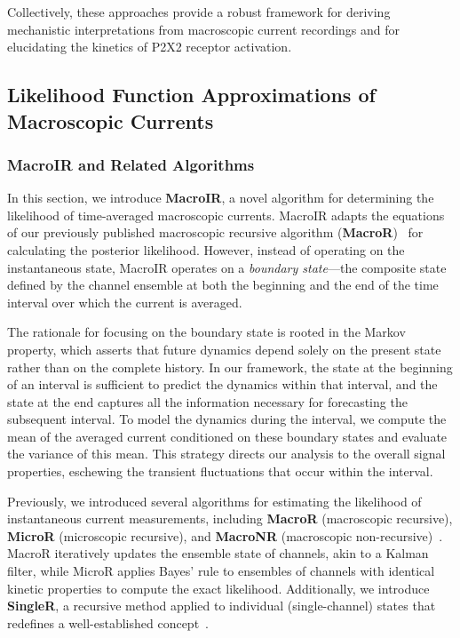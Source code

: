 \documentclass[9pt]{elife}
\begin{document}
	Collectively, these approaches provide a robust framework for deriving mechanistic interpretations from macroscopic current recordings and for elucidating the kinetics of P2X2 receptor activation.
	

\subsection{Likelihood Function Approximations of Macroscopic Currents}

\subsubsection{MacroIR and Related Algorithms}
In this section, we introduce \textbf{MacroIR}, a novel algorithm for determining the likelihood of time-averaged macroscopic currents. MacroIR adapts the equations of our previously published macroscopic recursive algorithm (\textbf{MacroR})~\cite{Moffatt} for calculating the posterior likelihood. However, instead of operating on the instantaneous state, MacroIR operates on a \emph{boundary state}—the composite state defined by the channel ensemble at both the beginning and the end of the time interval over which the current is averaged.

The rationale for focusing on the boundary state is rooted in the Markov property, which asserts that future dynamics depend solely on the present state rather than on the complete history. In our framework, the state at the beginning of an interval is sufficient to predict the dynamics within that interval, and the state at the end captures all the information necessary for forecasting the subsequent interval. To model the dynamics during the interval, we compute the mean of the averaged current conditioned on these boundary states and evaluate the variance of this mean. This strategy directs our analysis to the overall signal properties, eschewing the transient fluctuations that occur within the interval.

Previously, we introduced several algorithms for estimating the likelihood of instantaneous current measurements, including \textbf{MacroR} (macroscopic recursive), \textbf{MicroR} (microscopic recursive), and \textbf{MacroNR} (macroscopic non-recursive)~\cite{Moffatt}. MacroR iteratively updates the ensemble state of channels, akin to a Kalman filter, while MicroR applies Bayes’ rule to ensembles of channels with identical kinetic properties to compute the exact likelihood. Additionally, we introduce \textbf{SingleR}, a recursive method applied to individual (single-channel) states that redefines a well-established concept~\cite{Qin}.
\end{document}

